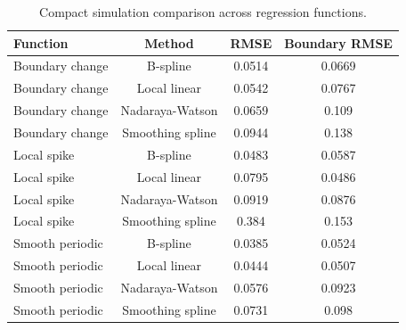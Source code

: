 \begin{table}[H]
\centering
\caption{Compact simulation comparison across regression functions.}
\label{tab:method-comparison}
\small
\begin{tabular}{lccc}
\toprule
Function & Method & RMSE & Boundary RMSE \\
\midrule
Boundary change & B-spline & 0.0514 & 0.0669 \\
Boundary change & Local linear & 0.0542 & 0.0767 \\
Boundary change & Nadaraya-Watson & 0.0659 & 0.109 \\
Boundary change & Smoothing spline & 0.0944 & 0.138 \\
Local spike & B-spline & 0.0483 & 0.0587 \\
Local spike & Local linear & 0.0795 & 0.0486 \\
Local spike & Nadaraya-Watson & 0.0919 & 0.0876 \\
Local spike & Smoothing spline & 0.384 & 0.153 \\
Smooth periodic & B-spline & 0.0385 & 0.0524 \\
Smooth periodic & Local linear & 0.0444 & 0.0507 \\
Smooth periodic & Nadaraya-Watson & 0.0576 & 0.0923 \\
Smooth periodic & Smoothing spline & 0.0731 & 0.098 \\
\bottomrule
\end{tabular}
\end{table}
